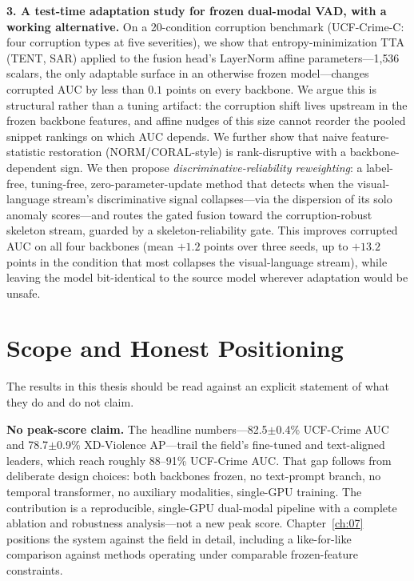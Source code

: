 \textbf{3. A test-time adaptation study for frozen dual-modal VAD, with a working alternative.} On a
20-condition corruption benchmark (UCF-Crime-C: four corruption types at five severities), we show
that entropy-minimization TTA (TENT, SAR) applied to the fusion head's LayerNorm affine
parameters---1{,}536 scalars, the only adaptable surface in an otherwise frozen model---changes
corrupted AUC by less than $0.1$ points on every backbone. We argue this is structural rather than a
tuning artifact: the corruption shift lives upstream in the frozen backbone features, and affine
nudges of this size cannot reorder the pooled snippet rankings on which AUC depends. We further show
that naive feature-statistic restoration (NORM/CORAL-style) is rank-disruptive with a
backbone-dependent sign. We then propose \emph{discriminative-reliability reweighting}: a
label-free, tuning-free, zero-parameter-update method that detects when the visual-language stream's
discriminative signal collapses---via the dispersion of its solo anomaly scores---and routes the
gated fusion toward the corruption-robust skeleton stream, guarded by a skeleton-reliability gate.
This improves corrupted AUC on all four backbones (mean $+1.2$ points over three seeds, up to
$+13.2$ points in the condition that most collapses the visual-language stream), while leaving the
model bit-identical to the source model wherever adaptation would be unsafe.

\section{Scope and Honest Positioning}
\label{sec:intro-scope}

The results in this thesis should be read against an explicit statement of what they do and do not claim.

\textbf{No peak-score claim.} The headline numbers---82.5$\pm$0.4\% UCF-Crime AUC and 78.7$\pm$0.9\%
XD-Violence AP---trail the field's fine-tuned and text-aligned leaders, which reach roughly 88--91\%
UCF-Crime AUC. That gap follows from deliberate design choices: both backbones frozen, no
text-prompt branch, no temporal transformer, no auxiliary modalities, single-GPU training. The
contribution is a reproducible, single-GPU dual-modal pipeline with a complete ablation and
robustness analysis---not a new peak score. Chapter~\ref{ch:07} positions the system against the
field in detail, including a like-for-like comparison against methods operating under comparable
frozen-feature constraints.

